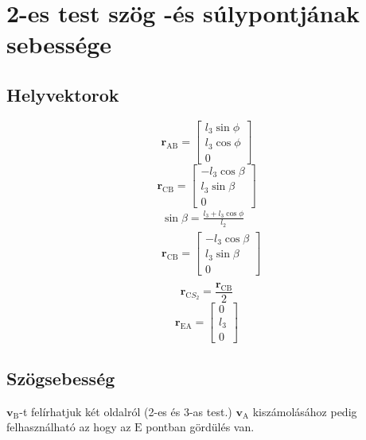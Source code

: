 \section{2-es test szög -és súlypontjának sebessége}

\subsection{Helyvektorok}
\begin{equation}
	\pmb{r}_\text{AB} =
	\begin{bmatrix}
		l_3 \sin\phi \\ l_3 \cos\phi \\ 0
	\end{bmatrix}
\end{equation}
\begin{equation}
	\pmb{r}_\text{CB} =
	\begin{bmatrix}
		-l_3 \cos\beta \\ l_3 \sin\beta \\ 0
	\end{bmatrix}
\end{equation}
\begin{align}
	&\sin\beta = \frac{l_3 + l_3\cos\phi}{l_2} \\
	&\pmb{r}_\text{CB} =
	\begin{bmatrix}
		-l_3 \cos\beta \\ l_3 \sin\beta \\ 0
	\end{bmatrix} \\
\end{align}
\begin{equation}
	\pmb{r}_{\text{C}{S_2}} = \frac{\pmb{r}_\text{CB}}{2}
\end{equation}
\begin{equation}
	\pmb{r}_\text{EA} = 
	\begin{bmatrix}
		0 \\ l_3 \\ 0
	\end{bmatrix}
\end{equation}

\subsection{Szögsebesség}
$\pmb{v}_\text{B}$-t felírhatjuk két oldalról (2-es és 3-as test.) $\pmb{v}_\text{A}$ kiszámolásához pedig felhasználható az hogy az $\text{E}$ pontban gördülés van.

